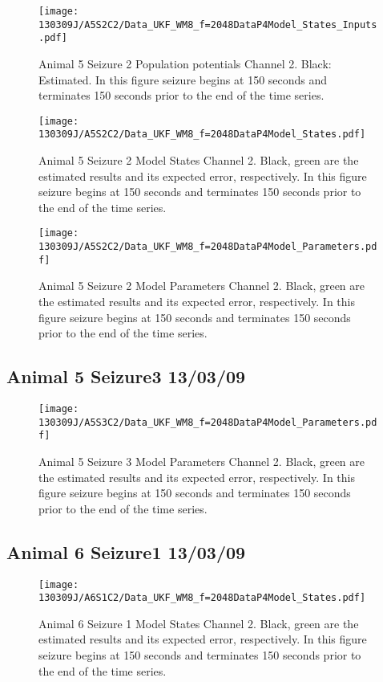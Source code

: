\begin{figure}
	\centering
		\texttt{[image: 130309J/A5S2C2/Data\_UKF\_WM8\_f=2048DataP4Model\_States\_Inputs.pdf]}
	\caption{Animal 5 Seizure 2 Population potentials Channel 2. Black: Estimated. In this figure seizure begins at 150 seconds and terminates 150 seconds prior to the end of the time series.}
	\label{fig: A5S2C2 PP}
\end{figure}

\begin{figure}
	\centering
		\texttt{[image: 130309J/A5S2C2/Data\_UKF\_WM8\_f=2048DataP4Model\_States.pdf]}
	\caption{Animal 5 Seizure 2 Model States Channel 2. Black, green are the estimated results and its expected error, respectively. In this figure seizure begins at 150 seconds and terminates 150 seconds prior to the end of the time series.}
	\label{fig: A5S2C2 MS}
\end{figure}

\begin{figure}
	\centering
		\texttt{[image: 130309J/A5S2C2/Data\_UKF\_WM8\_f=2048DataP4Model\_Parameters.pdf]}
	\caption{Animal 5 Seizure 2 Model Parameters Channel 2. Black, green are the estimated results and its expected error, respectively. In this figure seizure begins at 150 seconds and terminates 150 seconds prior to the end of the time series.}
	\label{fig: A5S2C2 MP}
\end{figure}

\subsection{Animal 5 Seizure3 13/03/09}

\begin{figure}
	\centering
		\texttt{[image: 130309J/A5S3C2/Data\_UKF\_WM8\_f=2048DataP4Model\_Parameters.pdf]}
	\caption{Animal 5 Seizure 3 Model Parameters Channel 2. Black, green are the estimated results and its expected error, respectively. In this figure seizure begins at 150 seconds and terminates 150 seconds prior to the end of the time series.}
	\label{fig: A5S3C2 MP}
\end{figure}

\subsection{Animal 6 Seizure1 13/03/09}

\begin{figure}
	\centering
		\texttt{[image: 130309J/A6S1C2/Data\_UKF\_WM8\_f=2048DataP4Model\_States.pdf]}
	\caption{Animal 6 Seizure 1 Model States Channel 2. Black, green are the estimated results and its expected error, respectively. In this figure seizure begins at 150 seconds and terminates 150 seconds prior to the end of the time series.}
	\label{fig: A6S1C2 MP}
\end{figure}

